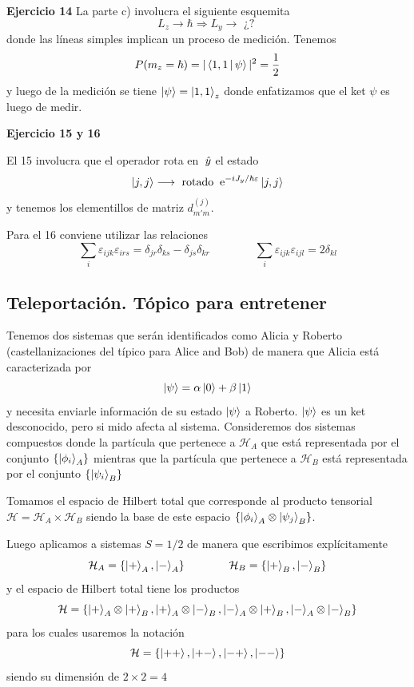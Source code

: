 \documentclass[10pt,oneside]{CBFT_book}
\begin{document}
\begin{ejemplo}{\bf Ejercicio 14}
La parte c) involucra el siguiente esquemita
\[
	L_z \longrightarrow \hbar \Longrightarrow L_y \longrightarrow \text{ ¿? }
\]
donde las líneas simples implican un proceso de medición.
Tenemos 
\[
	P(m_z=\hbar) = | \Braket{1,1|\psi} |^2 = \frac{1}{2}
\]
y luego de la medición se tiene $\Ket{\psi} = \Ket{1,1}_z$ donde enfatizamos que el ket $\psi$
es luego de medir.

\end{ejemplo}

\begin{ejemplo}{\bf Ejercicio 15 y 16}

El 15 involucra que el operador rota en $\:\hat{y}$ el estado
\[
	\Ket{j,j} \longrightarrow \text{ rotado } \:\mathrm{e}^{-i J_y/\hbar \varepsilon} \Ket{j,j}
\]
y tenemos los elementillos de matriz $d^{(j)}_{m'm}$.

Para el 16 conviene utilizar las relaciones
\[
	\sum_i \varepsilon_{ijk} \varepsilon_{irs} = \delta_{jr} \delta_{ks} - \delta_{js} \delta_{kr}
	\qquad \qquad 
	\sum_i \varepsilon_{ijk} \varepsilon_{ijl} = 2 \delta_{kl}
\]
 
\end{ejemplo}

\subsection{Teleportación. Tópico para entretener}

Tenemos dos sistemas que serán identificados como Alicia y Roberto (castellanizaciones del típico
para Alice and Bob) de manera que Alicia está caracterizada por
\[
	\Ket{\psi} = \alpha \Ket{0} + \beta \Ket{1}
\]
y necesita enviarle información de su estado $\Ket{\psi}$ a Roberto.
$\Ket{\psi}$ es un ket desconocido, pero si mido afecta al sistema.
Consideremos dos sistemas compuestos donde la partícula que pertenece a $\mathcal{H}_A$ que está
representada por el conjunto $\{ \Ket{\phi_i}_A \}$ mientras que la partícula que pertenece a
$\mathcal{H}_B$ está representada por el conjunto $\{ \Ket{\psi_i}_B \}$

Tomamos el espacio de Hilbert total que corresponde al producto tensorial $\mathcal{H} =
\mathcal{H}_A \times \mathcal{H}_B $ siendo la base de este espacio 
$ \{ \Ket{\phi_i}_A \otimes \Ket{\psi_j}_B \} $.

Luego aplicamos a sistemas $S=1/2$ de manera que escribimos explícitamente
\[
	\mathcal{H}_A = \{ \Ket{+}_A, \Ket{-}_A \} \qquad \qquad 
	\mathcal{H}_B = \{ \Ket{+}_B, \Ket{-}_B \}
\]
y el espacio de Hilbert total tiene los productos
\[
	\mathcal{H} = \{ \Ket{+}_A \otimes \Ket{+}_B, \Ket{+}_A \otimes \Ket{-}_B,
	\Ket{-}_A \otimes \Ket{+}_B, \Ket{-}_A \otimes \Ket{-}_B \}
\]
para los cuales usaremos la notación
\[
	\mathcal{H} = \{ \Ket{++}, \Ket{+-},\Ket{-+}, \Ket{--} \}
\]
siendo su dimensión de $2\times 2 =4$
\end{document}
